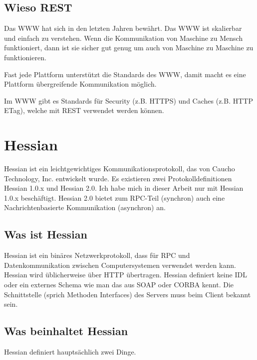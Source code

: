 \documentclass[abstracton, listof=totocnumbered,
bibliography=totocnumbered]{scrreprt}
\begin{document}
  \subsection{Wieso REST}
  
  Das \ac{WWW} hat sich in den letzten Jahren bewährt. Das \ac{WWW} ist
  skalierbar und einfach zu verstehen. Wenn die Kommunikation von Maschine zu Mensch
  funktioniert, dann ist sie sicher gut genug um auch von Maschine zu Maschine
  zu funktionieren.
  
  Fast jede Plattform unterstützt die Standards des \ac{WWW}, damit macht es
  eine Plattform übergreifende Kommunikation möglich.
  
  Im \ac{WWW} gibt es Standards für Security (z.B. \ac{HTTPS}) und Caches (z.B.
  \ac{HTTP} ETag), welche mit \ac{REST} verwendet werden können. 
  
  \section{Hessian}
  
  Hessian ist ein leichtgewichtiges Kommunikationsprotokoll, das von Caucho
  Technology, Inc. entwickelt wurde. Es existieren zwei Protokolldefinitionen
  Hessian 1.0.x und Hessian 2.0. Ich habe mich in dieser Arbeit nur mit
  Hessian 1.0.x beschäftigt. Hessian 2.0 bietet zum RPC-Teil (synchron) auch
  eine Nachrichtenbasierte Kommunikation (asynchron) an.
  
  \subsection{Was ist Hessian}
  
  Hessian ist ein binäres Netzwerkprotokoll, dass für \ac{RPC} und
  Datenkommunikation zwischen Computersystemen verwendet werden kann. Hessian wird üblicherweise
  über \ac{HTTP} übertragen. Hessian definiert keine \ac{IDL} oder ein externes
  Schema wie man das aus \ac{SOAP} oder \ac{CORBA} kennt. Die Schnittstelle (sprich
  Methoden Interfaces) des Servers muss beim Client bekannt sein.
  
  \subsection{Was beinhaltet Hessian}
  
  Hessian definiert hauptsächlich zwei Dinge.
  
\end{document}
